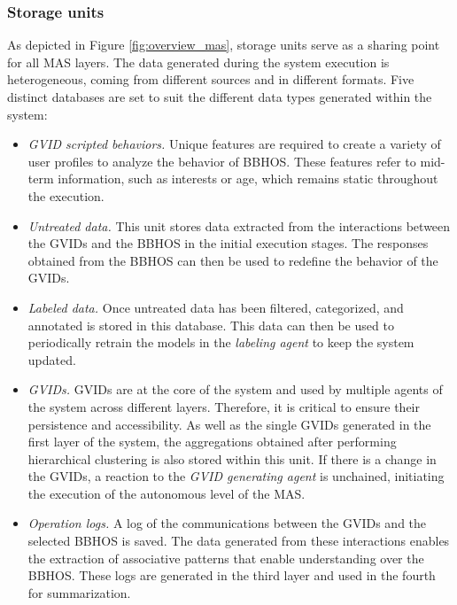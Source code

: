 \subsubsection*{Storage units}
As depicted in Figure \ref{fig:overview_mas}, storage units serve as a sharing point for all MAS layers. The data generated during the system execution is heterogeneous, coming from different sources and in different formats. Five distinct databases are set to suit the different data types generated within the system:
\begin{itemize}
    \item \textit{GVID scripted behaviors.} Unique features are required to create a variety of user profiles to analyze the behavior of BBHOS. These features refer to mid-term information, such as interests or age, which remains static throughout the execution.
    
    \item \textit{Untreated data.} This unit stores data extracted from the interactions between the GVIDs and the BBHOS in the initial execution stages. The responses obtained from the BBHOS can then be used to redefine the behavior of the GVIDs.
    
    \item \textit{Labeled data.} Once untreated data has been filtered, categorized, and annotated is stored in this database. This data can then be used to periodically retrain the models in the \textit{labeling agent} to keep the system updated. 
    
    \item \textit{GVIDs.} GVIDs are at the core of the system and used by multiple agents of the system across different layers. Therefore, it is critical to ensure their persistence and accessibility. As well as the single GVIDs generated in the first layer of the system, the aggregations obtained after performing hierarchical clustering is also stored within this unit. If there is a change in the GVIDs, a reaction to the \textit{GVID generating agent} is unchained, initiating the execution of the autonomous level of the MAS.
    
    \item \textit{Operation logs.} A log of the communications between the GVIDs and the selected BBHOS is saved. The data generated from these interactions enables the extraction of associative patterns that enable understanding over the BBHOS. These logs are generated in the third layer and used in the fourth for summarization.
\end{itemize}

